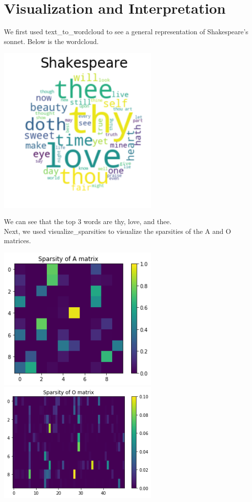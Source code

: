 \section{Visualization and Interpretation}
\medskip
We first used text_to_wordcloud to see a general representation of Shakespeare's sonnet. Below is the wordcloud. 
\begin{center}
	\includegraphics[width=8cm]{Picture/All}
\end{center}
We can see that the top 3 words are thy, love, and thee. \\
Next, we used visualize_sparsities to visualize the sparsities of the A and O matrices. 
\begin{center}
	\includegraphics[width=8cm]{Picture/A}
	\includegraphics[width=8cm]{Picture/O}
\end{center}

